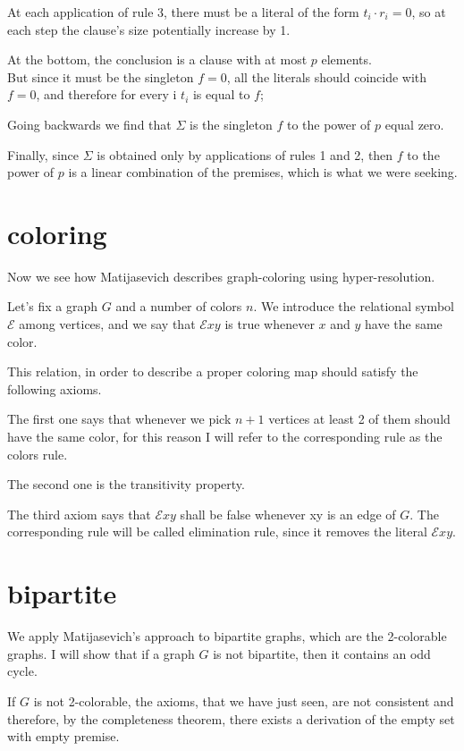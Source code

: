 \documentclass[12pt,a4paper,oneside]{article}
\newcommand{\E}{\mathscr{E}}
\begin{document}
At each application of rule 3, there must be a literal of the form $t_i \cdot r_i =0 $, so at each step the clause's size potentially increase by 1.

At the bottom, the conclusion is a clause with at most $p$ elements. \\
But since it must be the singleton $f=0$, all the literals should coincide with $f=0$, and therefore for every i $t_i$ is equal to $f$; 

Going backwards we find that $\Sigma$ is the singleton $f$ to the power of $p$ equal zero.

Finally, since $\Sigma$ is obtained only by applications of rules 1 and 2, then $f$ to the power of $p$ is a linear combination of the premises, which is what we were seeking. 



\newpage\section{coloring}
Now we see how Matijasevich describes graph-coloring using hyper-resolution.

Let's fix a graph $G$ and a number of colors $n$. We introduce the relational symbol $\E$ among vertices, and we say that $\E xy$ is true whenever $x$ and $y$ have the same color.

This relation, in order to describe a proper coloring map should satisfy the following axioms.

The first one says that whenever we pick $n+1$ vertices at least 2 of them should have the same color, for this reason I will refer to the corresponding rule as the colors rule. 

The second one is the transitivity property.

The third axiom says that $\E xy$ shall be false whenever xy is an edge of $G$. The corresponding rule will be called elimination rule, since it removes the literal $\E xy$.


\section{bipartite}
We apply Matijasevich's approach to bipartite graphs, which are the 2-colorable graphs. I will show that if a graph $G$ is not bipartite, then it contains an odd cycle. 

If $G$ is not 2-colorable, the axioms, that we have just seen, are not consistent and therefore, by the completeness theorem, there exists a derivation of the empty set with empty premise.
\end{document}
